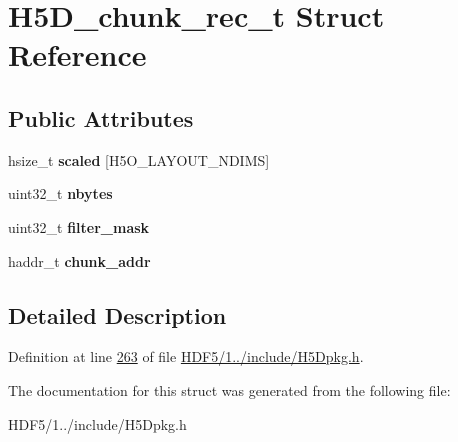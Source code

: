 \hypertarget{struct_h5_d__chunk__rec__t}{}\section{H5\+D\+\_\+chunk\+\_\+rec\+\_\+t Struct Reference}
\label{struct_h5_d__chunk__rec__t}
\subsection*{Public Attributes}
\begin{DoxyCompactItemize}
\item 
\mbox{\label{struct_h5_d__chunk__rec__t_a4d2fddc14e849df079e5de4d033b9b59}} 
hsize\+\_\+t {\bfseries scaled} \mbox{[}H5\+O\+\_\+\+L\+A\+Y\+O\+U\+T\+\_\+\+N\+D\+I\+MS\mbox{]}
\item 
\mbox{\label{struct_h5_d__chunk__rec__t_af1479ae1675ae0f027f8340eb1407f75}} 
uint32\+\_\+t {\bfseries nbytes}
\item 
\mbox{\label{struct_h5_d__chunk__rec__t_a02990e994631d3cf4f48da5f638c1077}} 
uint32\+\_\+t {\bfseries filter\+\_\+mask}
\item 
\mbox{\label{struct_h5_d__chunk__rec__t_a331d3d7e1d32c0456a0d8e86d3c36725}} 
haddr\+\_\+t {\bfseries chunk\+\_\+addr}
\end{DoxyCompactItemize}


\subsection{Detailed Description}


Definition at line \hyperlink{_h_d_f5_21_810_81_2include_2_h5_dpkg_8h_source_l00263}{263} of file \hyperlink{_h_d_f5_21_810_81_2include_2_h5_dpkg_8h_source}{H\+D\+F5/1../include/\+H5\+Dpkg.\+h}.



The documentation for this struct was generated from the following file\+:\begin{DoxyCompactItemize}
\item 
H\+D\+F5/1../include/\+H5\+Dpkg.\+h\end{DoxyCompactItemize}
